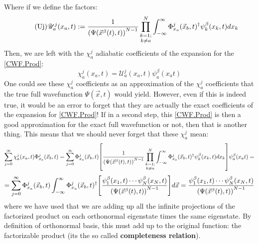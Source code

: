 \documentclass[11pt, a4paper]{article} %
\newcommand{\U}{\mathscr{U}}
\begin{document}
Where if we define the factors:
\begin{equation}\label{Uj}\tag{Uj}
\U^j_a(x_a,t):=\frac{1}{ \qty(\Psi(\vec{x}^\beta(t),t))^{N-1}}\prod_{\substack{k=1; \\ k\neq a}}^{N} \int_{-\infty}^\infty \Phi_{x_a}^j(\vec{x}_b,t)^\dagger \psi^\beta_k(x_k,t) dx_k 
\end{equation}
Then, we are left with the $\chi^j_a$ adiabatic coefficients of the expansion for the \ref{CWF.Prod}:
$$
\chi_a^j(x_a,t)= \U^j_a(x_a,t)\psi_a^\beta(x_a t)
$$
One could see these $\chi^j_a$ coefficients as an approximation of the $\chi_a^j$ coefficients that the true full wavefunction $\Psi(\vec{x},t)$ would yield. However, even if this is indeed true, it would be an error to forget that they are actually the exact coefficients of the expansion for \ref{CWF.Prod}! If in a second step, this \ref{CWF.Prod} is then a good approximation for the exact full wavefunction or not, then that is another thing. This means that we should never forget that these $\chi_a^j$ mean:
$$
\sum_{j=0}^\infty \chi^j_a(x_a,t) \Phi_{x_a}^j(\vec{x}_b,t) = \sum_{j=0}^\infty \Phi_{x_a}^j(\vec{x}_b,t) \qty[\frac{1}{ \qty(\Psi(\vec{x}^\beta(t),t))^{N-1}}\prod_{\substack{k=1; \\ k\neq a}}^{N} \int_{-\infty}^\infty \Phi_{x_a}^j(\vec{x}_b,t)^\dagger \psi^\beta_k(x_k,t) dx_k ] \psi_a^\beta(x_a t)=
$$
$$
=\sum_{j=0}^\infty \Phi_{x_a}^j(\vec{x}_b,t)\int_{-\infty}^\infty \Phi_{x_a}^j(\vec{x}_b,t)^\dagger \qty[ \frac{\psi^\beta_1(x_1,t)\cdots \psi^\beta_N(x_N,t) }{\qty(\Psi(\vec{x}^\beta(t),t))^{N-1}} ]d\vec{x}=\frac{\psi^\beta_1(x_1,t)\cdots \psi^\beta_N(x_N,t) }{\qty(\Psi(\vec{x}^\beta(t),t))^{N-1}}
$$
where we have used that we are adding up all the infinite projections of the factorized product on each orthonormal eigenstate times the same eigenstate. By definition of orthonormal basis, this must add up to the original function: the factorizable product (its the so called {\bf completeness relation}).\\
\end{document}
